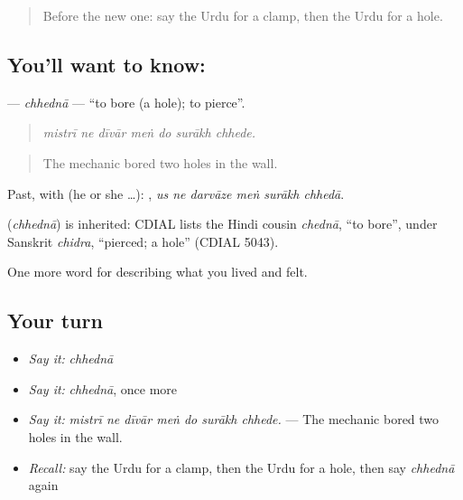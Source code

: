 \begin{quote}
Before the new one: say the Urdu for a clamp, then the Urdu for a hole.
\end{quote}

\subsection*{You'll want to know: }
\textbf{} — \emph{chhednā} — \textquotedblleft{}to bore (a hole); to pierce\textquotedblright{}.

\begin{quote}
      
\end{quote}

\begin{quote}
\emph{mistrī ne dīvār meṅ do surākh chhede.}
\end{quote}

\begin{quote}
The mechanic bored two holes in the wall.
\end{quote}

Past, with  (he or she …):      , \emph{us ne darvāze meṅ surākh chhedā}.

\begin{cousinweb}
\textbf{} (\emph{chhednā}) is inherited: CDIAL lists the Hindi cousin \emph{chednā}, \textquotedblleft{}to bore\textquotedblright{}, under Sanskrit \emph{chidra}, \textquotedblleft{}pierced; a hole\textquotedblright{} (CDIAL 5043).
\end{cousinweb}

\begin{grammarlens}[title={What you've built}]
One more word for describing what you lived and felt.
\end{grammarlens}

\subsection*{Your turn}
\begin{itemize}
\raggedright
  \item \emph{Say it:} \emph{chhednā}
  \item \emph{Say it:} \emph{chhednā}, once more
  \item \emph{Say it:} \emph{mistrī ne dīvār meṅ do surākh chhede.} — The mechanic bored two holes in the wall.
  \item \emph{Recall:} say the Urdu for a clamp, then the Urdu for a hole, then say \emph{chhednā} again
\end{itemize}

